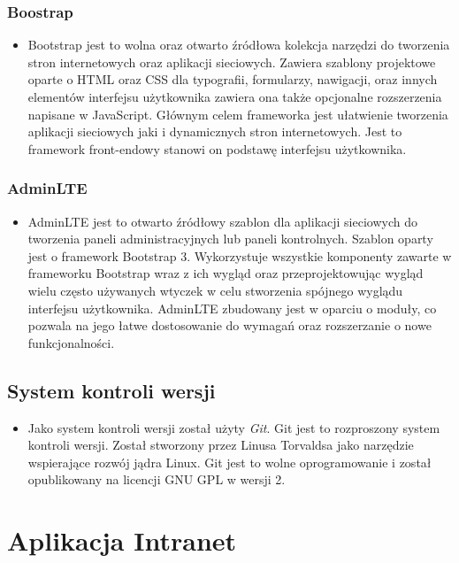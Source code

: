\documentclass{beamer}
\newenvironment{justbe}%
{\setlength{\leftmargini}{0pt}\begin{itemize}\item[]}%
{\end{itemize}}
\begin{document}
\begin{frame}
 \frametitle{Boostrap}
 \begin{justbe}
  Bootstrap jest to wolna oraz otwarto źródłowa kolekcja narzędzi do tworzenia stron internetowych oraz aplikacji sieciowych. Zawiera szablony projektowe oparte o HTML oraz CSS dla typografii, formularzy, nawigacji, oraz innych elementów interfejsu użytkownika zawiera ona także opcjonalne rozszerzenia napisane w JavaScript. Głównym celem frameworka jest ułatwienie tworzenia aplikacji sieciowych jaki i  dynamicznych stron internetowych. Jest to framework front-endowy stanowi on podstawę interfejsu użytkownika.
 \end{justbe}
\end{frame}
\begin{frame}
 \frametitle{AdminLTE}
 \begin{justbe}
  AdminLTE jest to otwarto źródłowy szablon dla aplikacji sieciowych do tworzenia paneli administracyjnych lub paneli kontrolnych. Szablon oparty jest o framework Bootstrap 3. Wykorzystuje wszystkie komponenty zawarte w frameworku Bootstrap wraz z ich wygląd oraz przeprojektowując wygląd wielu często używanych wtyczek w celu stworzenia spójnego wyglądu interfejsu użytkownika. AdminLTE zbudowany jest w oparciu o moduły, co pozwala na jego łatwe dostosowanie do wymagań oraz rozszerzanie o nowe funkcjonalności.
 \end{justbe}
\end{frame}

\subsection{System kontroli wersji}
\begin{frame}
 \begin{justbe}
    Jako system kontroli wersji został użyty \emph{Git}. Git jest to rozproszony system kontroli wersji. Został stworzony przez Linusa Torvaldsa jako narzędzie wspierające rozwój jądra Linux. Git jest to wolne oprogramowanie i został opublikowany na licencji GNU GPL w wersji 2.
 \end{justbe}
\end{frame}

\section{Aplikacja Intranet}
\end{document}
